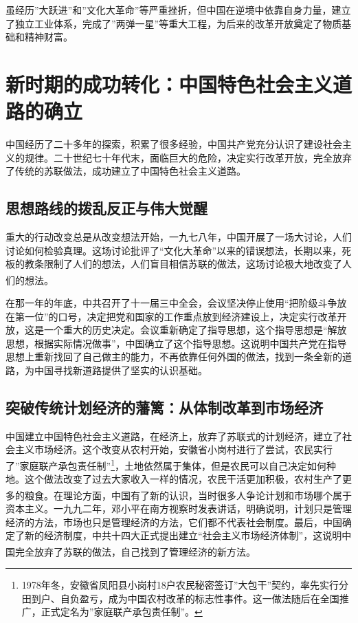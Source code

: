 \documentclass[12pt, a4paper]{ctexart}
\newcommand{\upcite}[1]{\textsuperscript{\cite{#1}}}
\numberwithin{table}{section}
\numberwithin{figure}{section}
\begin{document}
\begin{summarybox}
虽经历”大跃进”和”文化大革命”等严重挫折，但中国在逆境中依靠自身力量，建立了独立工业体系，完成了”两弹一星”等重大工程，为后来的改革开放奠定了物质基础和精神财富。
\end{summarybox}

\section{新时期的成功转化：中国特色社会主义道路的确立}
中国经历了二十多年的探索，积累了很多经验，中国共产党充分认识了建设社会主义的规律。二十世纪七十年代末，面临巨大的危险，决定实行改革开放，完全放弃了传统的苏联做法，成功建立了中国特色社会主义道路。

\subsection{思想路线的拨乱反正与伟大觉醒}
重大的行动改变总是从改变想法开始，一九七八年，中国开展了一场大讨论，人们讨论如何检验真理。这场讨论批评了“文化大革命”以来的错误想法，长期以来，死板的教条限制了人们的想法，人们盲目相信苏联的做法，这场讨论极大地改变了人们的想法\upcite{ref11}。

在那一年的年底，中共召开了十一届三中全会，会议坚决停止使用“把阶级斗争放在第一位”的口号，决定把党和国家的工作重点放到经济建设上，决定实行改革开放，这是一个重大的历史决定。会议重新确定了指导思想，这个指导思想是“解放思想，根据实际情况做事”，中国确立了这个指导思想。这说明中国共产党在指导思想上重新找回了自己做主的能力，不再依靠任何外国的做法，找到一条全新的道路，为中国寻找新道路提供了坚实的认识基础。

\subsection{突破传统计划经济的藩篱：从体制改革到市场经济}
中国建立中国特色社会主义道路，在经济上，放弃了苏联式的计划经济，建立了社会主义市场经济。这个改变从农村开始，安徽省小岗村进行了尝试，农民实行了”家庭联产承包责任制”\footnote{1978年冬，安徽省凤阳县小岗村18户农民秘密签订”大包干”契约，率先实行分田到户、自负盈亏，成为中国农村改革的标志性事件。这一做法随后在全国推广，正式定名为”家庭联产承包责任制”。}，土地依然属于集体，但是农民可以自己决定如何种地。这个做法改变了过去大家收入一样的情况，农民干活更加积极，农村生产了更多的粮食\upcite{ref12}。在理论方面，中国有了新的认识，当时很多人争论计划和市场哪个属于资本主义。一九九二年，邓小平在南方视察时发表讲话，明确说明，计划只是管理经济的方法，市场也只是管理经济的方法，它们都不代表社会制度。最后，中国确定了新的经济制度，中共十四大正式提出建立“社会主义市场经济体制”，这说明中国完全放弃了苏联的做法，自己找到了管理经济的新方法\upcite{ref13}。
\end{document}
